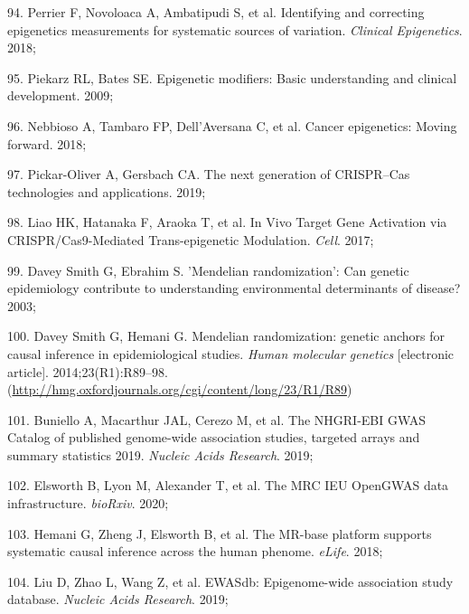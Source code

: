 \documentclass[11pt,oneside]{bristolthesis}
\newenvironment{cslreferences}%
  {}%
  {\par}
\begin{document}
\begin{cslreferences}
\leavevmode\hypertarget{ref-Perrier2018}{}%
94. Perrier F, Novoloaca A, Ambatipudi S, et al. Identifying and correcting epigenetics measurements for systematic sources of variation. \emph{Clinical Epigenetics}. 2018;

\leavevmode\hypertarget{ref-Piekarz2009}{}%
95. Piekarz RL, Bates SE. Epigenetic modifiers: Basic understanding and clinical development. 2009;

\leavevmode\hypertarget{ref-Nebbioso2018}{}%
96. Nebbioso A, Tambaro FP, Dell'Aversana C, et al. Cancer epigenetics: Moving forward. 2018;

\leavevmode\hypertarget{ref-Pickar-Oliver2019}{}%
97. Pickar-Oliver A, Gersbach CA. The next generation of CRISPR--Cas technologies and applications. 2019;

\leavevmode\hypertarget{ref-Liao2017}{}%
98. Liao HK, Hatanaka F, Araoka T, et al. In Vivo Target Gene Activation via CRISPR/Cas9-Mediated Trans-epigenetic Modulation. \emph{Cell}. 2017;

\leavevmode\hypertarget{ref-DaveySmith2003}{}%
99. Davey Smith G, Ebrahim S. 'Mendelian randomization': Can genetic epidemiology contribute to understanding environmental determinants of disease? 2003;

\leavevmode\hypertarget{ref-DaveySmith2014}{}%
100. Davey Smith G, Hemani G. Mendelian randomization: genetic anchors for causal inference in epidemiological studies. \emph{Human molecular genetics} {[}electronic article{]}. 2014;23(R1):R89--98. (\url{http://hmg.oxfordjournals.org/cgi/content/long/23/R1/R89})

\leavevmode\hypertarget{ref-Buniello2019}{}%
101. Buniello A, Macarthur JAL, Cerezo M, et al. The NHGRI-EBI GWAS Catalog of published genome-wide association studies, targeted arrays and summary statistics 2019. \emph{Nucleic Acids Research}. 2019;

\leavevmode\hypertarget{ref-Elsworth2020}{}%
102. Elsworth\hspace{0pt} B, Lyon\hspace{0pt} M, Alexander\hspace{0pt} T, et al. The MRC IEU OpenGWAS data infrastructure. \emph{bioRxiv}. 2020;

\leavevmode\hypertarget{ref-Hemani2018}{}%
103. Hemani G, Zheng J, Elsworth B, et al. The MR-base platform supports systematic causal inference across the human phenome. \emph{eLife}. 2018;

\leavevmode\hypertarget{ref-Liu2019}{}%
104. Liu D, Zhao L, Wang Z, et al. EWASdb: Epigenome-wide association study database. \emph{Nucleic Acids Research}. 2019;


\end{cslreferences}
\end{document}

